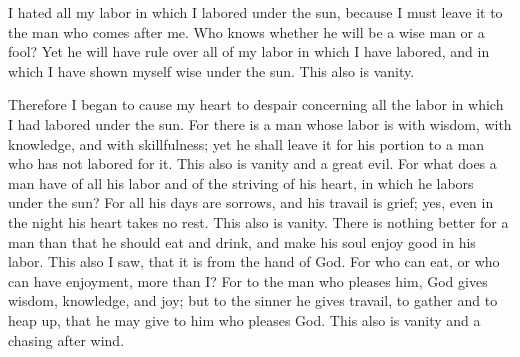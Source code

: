 {I hated all my labor in which I labored under the sun, because I must leave it to the man who comes after me.
Who knows whether he will be a wise man or a fool? Yet he will have rule over all of my labor in which I have labored, and in which I have shown myself wise under the sun. This also is vanity.
\par }{\PP {}Therefore I began to cause my heart to despair concerning all the labor in which I had labored under the sun.
For there is a man whose labor is with wisdom, with knowledge, and with skillfulness; yet he shall leave it for his portion to a man who has not labored for it. This also is vanity and a great evil.
For what does a man have of all his labor and of the striving of his heart, in which he labors under the sun?
For all his days are sorrows, and his travail is grief; yes, even in the night his heart takes no rest. This also is vanity.
There is nothing better for a man than that he should eat and drink, and make his soul enjoy good in his labor. This also I saw, that it is from the hand of God.
For who can eat, or who can have enjoyment, more than I?
For to the man who pleases him, God gives wisdom, knowledge, and joy; but to the sinner he gives travail, to gather and to heap up, that he may give to him who pleases God. This also is vanity and a chasing after wind.

}
